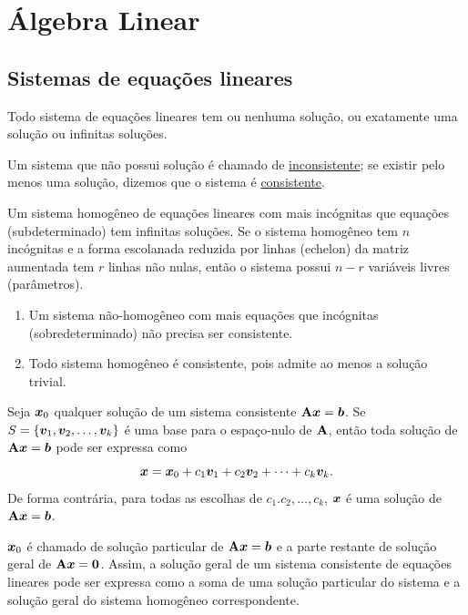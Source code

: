 
\chapter{Álgebra Linear}

\section{Sistemas de equações lineares}

\begin{theorem}
	 Todo sistema de equações lineares tem ou nenhuma solução, ou exatamente uma solução ou infinitas soluções.
	 \begin{note}
	 	Um sistema que não possui solução é chamado de \underline{inconsistente}; se existir pelo menos uma solução, dizemos que o sistema é \underline{consistente}.
	 \end{note}
\end{theorem}

\begin{theorem}
	\leavevmode
	\begin{outline}[enumerate]
		\1 Um sistema homogêneo de equações lineares com mais incógnitas que equações (subdeterminado) tem infinitas soluções.
		\1 Se o sistema homogêneo tem $n$ incógnitas e a forma escolanada reduzida por linhas (echelon) da matriz aumentada tem $r$ linhas não nulas, então o sistema possui $n-r$ variáveis livres (parâmetros).
	\end{outline}
		\begin{note}
		\leavevmode
		\begin{enumerate}
			\item Um sistema não-homogêneo com mais equações que incógnitas (sobredeterminado) não precisa ser consistente.
			\item Todo sistema homogêneo é consistente, pois admite ao menos a solução trivial.
		\end{enumerate}
	\end{note}
\end{theorem}

\begin{theorem} Seja $\bm{x}_0$ qualquer solução de um sistema consistente $\mathbf{A}\bm{x}=\bm{b}$. Se $S=\{\bm{v}_1, \bm{v}_2, \ldots, \bm{v}_k\}$ é uma base para o espaço-nulo de $\mathbf{A}$, então toda solução de $\mathbf{A}\bm{x}=\bm{b}$ pode ser expressa como
	\begin{equation}
		\bm{x} = \bm{x}_0 + c_1\bm{v}_1 + c_2\bm{v}_2 + \cdots + c_k\bm{v}_k.
	\end{equation}
	De forma contrária, para todas as escolhas de $c_1. c_2, \ldots, c_k$, $\bm{x}$ é uma solução de $\mathbf{A}\bm{x}=\bm{b}$.
	\begin{note}
		$\bm{x}_0$ é chamado de solução particular de $\mathbf{A}\bm{x}=\bm{b}$ e a parte restante de solução geral de $\mathbf{A}\bm{x}=\bm{0}$. Assim, a solução geral de um sistema consistente de equações lineares pode ser expressa como a soma de uma solução particular do sistema e a solução geral do sistema homogêneo correspondente.
	\end{note}
\end{theorem}

